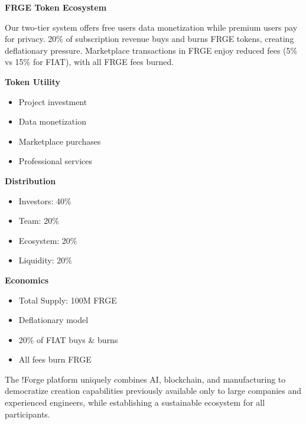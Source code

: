 \vspace{0.2cm}
\begin{center}
\begin{minipage}{0.95\textwidth}
\textcolor{fabAccent}{\textbf{FRGE Token Ecosystem}}
\end{minipage}
\end{center}

\vspace{0.05cm}
\noindent Our two-tier system offers free users data monetization while premium users pay for privacy. 20\% of subscription revenue buys and burns FRGE tokens, creating deflationary pressure. Marketplace transactions in FRGE enjoy reduced fees (5\% vs 15\% for FIAT), with all FRGE fees burned.

\vspace{0.2cm}
\begin{multicols}{3}
\textcolor{fabPrimary}{\textbf{Token Utility}}
\begin{itemize}[leftmargin=*, topsep=0pt, itemsep=0pt]
    \item Project investment
    \item Data monetization
    \item Marketplace purchases
    \item Professional services
\end{itemize}

\columnbreak

\textcolor{fabPrimary}{\textbf{Distribution}}
\begin{itemize}[leftmargin=*, topsep=0pt, itemsep=0pt]
    \item Investors: 40\%
    \item Team: 20\%
    \item Ecosystem: 20\%
    \item Liquidity: 20\%
\end{itemize}

\columnbreak

\textcolor{fabPrimary}{\textbf{Economics}}
\begin{itemize}[leftmargin=*, topsep=0pt, itemsep=0pt]
    \item Total Supply: 100M FRGE
    \item Deflationary model
    \item 20\% of FIAT buys \& burns
    \item All fees burn FRGE
\end{itemize}
\end{multicols}

\vspace{0.2cm}
\noindent The !Forge platform uniquely combines AI, blockchain, and manufacturing to democratize creation capabilities previously available only to large companies and experienced engineers, while establishing a sustainable ecosystem for all participants. 